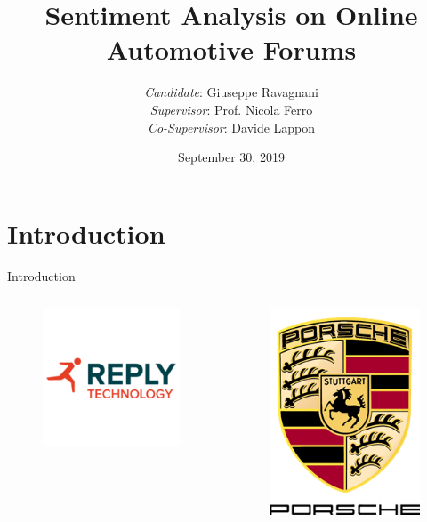 \documentclass{beamer}
\title{Sentiment Analysis on Online Automotive Forums}
\author[me]{\vspace{5mm}\textit{Candidate}: Giuseppe Ravagnani\\\textit{Supervisor}: Prof. Nicola Ferro\\\textit{Co-Supervisor}: Davide Lappon\\[5mm]}
\date{September 30, 2019}
\begin{document}
	\maketitle



	\section{Introduction}
	
	\begin{frame}{Introduction}
		\begin{columns}
			\centering
			\begin{figure}
				\includegraphics[width=.9\linewidth]{figures/reply.png}
			\end{figure}
			\centering
			\begin{figure}
				\includegraphics[width=.6\linewidth]{figures/porsche.png}

\end{figure}
\end{columns}
\end{frame}
\end{document}
